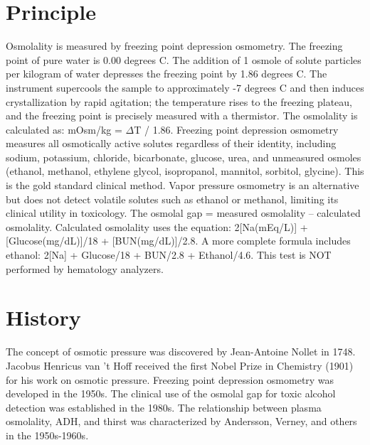 \section*{Principle}
Osmolality is measured by freezing point depression osmometry. The freezing point of pure water is 0.00 degrees C. The addition of 1 osmole of solute particles per kilogram of water depresses the freezing point by 1.86 degrees C. The instrument supercools the sample to approximately -7 degrees C and then induces crystallization by rapid agitation; the temperature rises to the freezing plateau, and the freezing point is precisely measured with a thermistor. The osmolality is calculated as: mOsm/kg = $\Delta$T / 1.86. Freezing point depression osmometry measures all osmotically active solutes regardless of their identity, including sodium, potassium, chloride, bicarbonate, glucose, urea, and unmeasured osmoles (ethanol, methanol, ethylene glycol, isopropanol, mannitol, sorbitol, glycine). This is the gold standard clinical method. Vapor pressure osmometry is an alternative but does not detect volatile solutes such as ethanol or methanol, limiting its clinical utility in toxicology. The osmolal gap = measured osmolality -- calculated osmolality. Calculated osmolality uses the equation: 2[Na(mEq/L)] + [Glucose(mg/dL)]/18 + [BUN(mg/dL)]/2.8. A more complete formula includes ethanol: 2[Na] + Glucose/18 + BUN/2.8 + Ethanol/4.6. This test is NOT performed by hematology analyzers.

\section*{History}
The concept of osmotic pressure was discovered by Jean-Antoine Nollet in 1748. Jacobus Henricus van 't Hoff received the first Nobel Prize in Chemistry (1901) for his work on osmotic pressure. Freezing point depression osmometry was developed in the 1950s. The clinical use of the osmolal gap for toxic alcohol detection was established in the 1980s. The relationship between plasma osmolality, ADH, and thirst was characterized by Andersson, Verney, and others in the 1950s-1960s.

